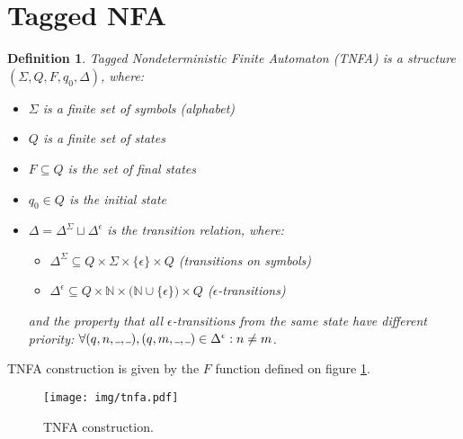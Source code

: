 \documentclass[AMA,STIX1COL]{WileyNJD-v2}
\newcommand{\Xund}{\rule{.4em}{.4pt}}
\newcommand{\YN}{\mathbb{N}}
\newtheorem{Xdef}{Definition}
\begin{document}
\FloatBarrier


\section{Tagged NFA}

    \begin{Xdef}
    \emph{Tagged Nondeterministic Finite Automaton (TNFA)}
    is a structure $(\Sigma, Q, F, q_0, \Delta)$, where:
    \begin{itemize}
        \item[] $\Sigma$ is a finite set of symbols (\emph{alphabet})
        \item[] $Q$ is a finite set of \emph{states}
        \item[] $F \subseteq Q$ is the set of \emph{final} states
        \item[] $q_0 \in Q$ is the \emph{initial} state


        \item[] $\Delta = \Delta^\Sigma \sqcup \Delta^\epsilon$ is the \emph{transition} relation, where:
        \begin{itemize}
            \item[] $\Delta^\Sigma \subseteq Q \times \Sigma \times \{\epsilon\} \times Q$ (transitions on symbols)
            \item[] $\Delta^\epsilon \subseteq Q \times \YN \times \big( \YN \cup \{\epsilon\} \big) \times Q$ ($\epsilon$-transitions)
        \end{itemize}
        and the property that all $\epsilon$-transitions from the same state have different priority:
        $\forall (q, n, \Xund, \Xund), (q, m, \Xund, \Xund) \in \Delta^\epsilon: n \neq m$.
    \end{itemize}
    \end{Xdef}

TNFA construction is given by the $F$ function defined on figure \ref{fig_tnfa}.

\begin{figure}\label{fig_tnfa}
\texttt{[image: img/tnfa.pdf]}
\caption{
TNFA construction.
}
\end{figure}

\FloatBarrier
\end{document}
